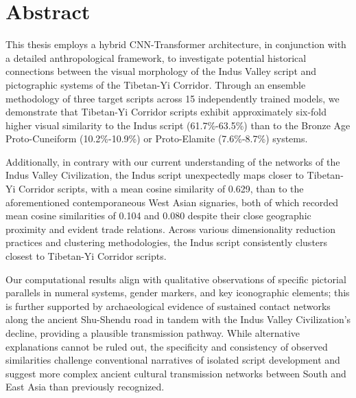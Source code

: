 \documentclass[11pt,a4paper,oneside]{report}
\begin{document}

\clearpage
{}


\setcounter{tocdepth}{0} %
\tableofcontents


\chapter*{Abstract}
\noindent\hspace{1cm}
This thesis employs a hybrid CNN-Transformer architecture, in conjunction with a detailed anthropological framework, to investigate potential historical connections between the visual morphology of the Indus Valley script and pictographic systems of the Tibetan-Yi Corridor. Through an ensemble methodology of three target scripts across 15 independently trained models, we demonstrate that Tibetan-Yi Corridor scripts exhibit approximately six-fold higher visual similarity to the Indus script (61.7\%-63.5\%) than to the Bronze Age Proto-Cuneiform (10.2\%-10.9\%) or Proto-Elamite (7.6\%-8.7\%) systems. 

Additionally, in contrary with our current understanding of the networks of the Indus Valley Civilization, the Indus script unexpectedly maps closer to Tibetan-Yi Corridor scripts, with a mean cosine similarity of 0.629, than to the aforementioned contemporaneous West Asian signaries, both of which recorded mean cosine similarities of 0.104 and 0.080 despite their close geographic proximity and evident trade relations. Across various dimensionality reduction practices and clustering methodologies, the Indus script consistently clusters closest to Tibetan-Yi Corridor scripts. 

Our computational results align with qualitative observations of specific pictorial parallels in numeral systems, gender markers, and key iconographic elements; this is further supported by archaeological evidence of sustained contact networks along the ancient Shu-Shendu road in tandem with the Indus Valley Civilization's decline, providing a plausible transmission pathway. While alternative explanations cannot be ruled out, the specificity and consistency of observed similarities challenge conventional narratives of isolated script development and suggest more complex ancient cultural transmission networks between South and East Asia than previously recognized.
\end{document}
